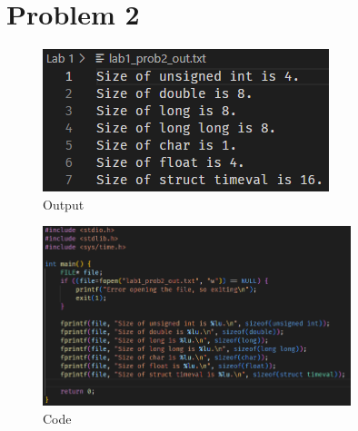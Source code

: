 \clearpage
\section*{Problem 2}
\begin{figure}[h!]
    \centering
    \includegraphics{Images/2a Output.png}
    \caption{Output}
\end{figure}

\begin{figure}[h!]
    \centering
    \includegraphics[width=0.8\textwidth]{Images/2a Code.png}
    \caption{Code}
\end{figure}